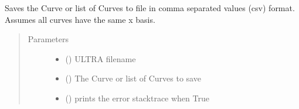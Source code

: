 \documentclass[letterpaper,10pt,english]{sphinxmanual}
\begin{document}
\begin{fulllineitems}
\label{\detokenize{pydv:pydvpy.savecsv}}
Saves the Curve or list of Curves to file in comma separated values (csv) format. Assumes
all curves have the same x basis.

\begin{sphinxVerbatim}[commandchars=\\\{\}]
  
\end{sphinxVerbatim}

\begin{sphinxVerbatim}[commandchars=\\\{\}]
\PYG{p}{[}   \PYG{p}{]} \PYG{p}{[}   \PYG{p}{]}
\end{sphinxVerbatim}

\begin{sphinxVerbatim}[commandchars=\\\{\}]
 
\end{sphinxVerbatim}
\begin{quote}\begin{description}
\item[{Parameters}] \leavevmode\begin{itemize}
\item {} 
 () \textendash{} ULTRA filename

\item {} 
 () \textendash{} The Curve or list of Curves to save

\item {} 
 () \textendash{} prints the error stacktrace when True

\end{itemize}

\end{description}\end{quote}

\end{fulllineitems}
\end{document}
